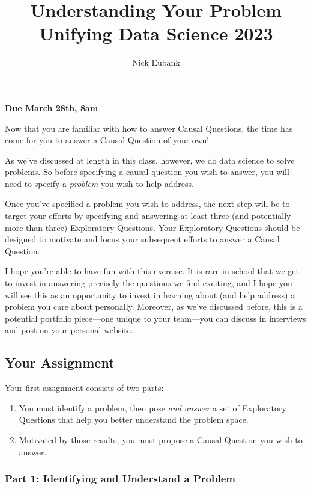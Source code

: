 \documentclass[12pt]{article}
\title{Understanding Your Problem \\ Unifying Data Science 2023}
\author{Nick Eubank}
\begin{document}
\maketitle

\begin{center}
     \textbf{Due March 28th, 8am}
\end{center}

Now that you are familiar with how to answer Causal Questions, the time has come for you to answer a Causal Question of your own!

As we've discussed at length in this class, however, we do data science to solve problems. So before specifying a causal question you wish to answer, you will need to specify a \emph{problem} you wish to help address.

Once you've specified a problem you wish to address, the next step will be to target your efforts by specifying and answering at least three (and potentially more than three) Exploratory Questions. Your Exploratory Questions should be designed to motivate and focus your subsequent efforts to answer a Causal Question.

I hope you're able to have fun with this exercise. It is rare in school that we get to invest in answering precisely the questions we find exciting, and I hope you will see this as an opportunity to invest in learning about (and help address) a problem you care about personally. Moreover, as we've discussed before, this is a potential portfolio piece—one unique to your team—you can discuss in interviews and post on your personal website.

\subsection*{Your Assignment}

Your first assignment consists of two parts: 

\begin{enumerate}
    \item You must identify a problem, then pose \emph{and answer} a set of Exploratory Questions that help you better understand the problem space.
    \item Motivated by those results, you must propose a Causal Question you wish to answer.
\end{enumerate} 

\subsubsection*{Part 1: Identifying and Understand a Problem}
\end{document}
